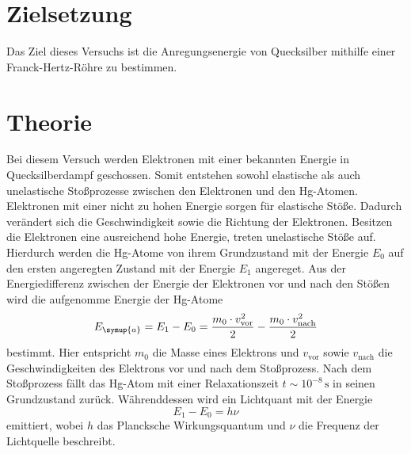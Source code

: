 \nocite{anleitungV601}
\section{Zielsetzung}
\label{sec:Zielsetzung}
Das Ziel dieses Versuchs ist die Anregungsenergie von Quecksilber mithilfe einer Franck-Hertz-Röhre zu bestimmen. 

\section{Theorie}
\label{sec:Theorie}
Bei diesem Versuch werden Elektronen mit einer bekannten Energie in Quecksilberdampf geschossen. Somit entstehen sowohl elastische als auch unelastische
Stoßprozesse zwischen den Elektronen und den Hg-Atomen. Elektronen mit einer nicht zu hohen Energie sorgen für elastische Stöße. Dadurch verändert sich die
Geschwindigkeit sowie die Richtung der Elektronen. Besitzen die Elektronen eine ausreichend hohe Energie, treten unelastische Stöße auf. Hierdurch werden die Hg-Atome
von ihrem Grundzustand mit der Energie $E_0$ auf den ersten angeregten Zustand mit der Energie $E_1$ angereget. Aus der Energiedifferenz zwischen der Energie der Elektronen 
vor und nach den Stößen wird die aufgenomme Energie der Hg-Atome
\begin{equation}
    E_{\symup{a}}=E_1 - E_0 =\frac{m_0\cdot v_{\text{vor}}^2}{2} - \frac{m_0\cdot v_{\text{nach}}^2}{2}
    \label{eqn:Energiedifferenz}
\end{equation}
bestimmt. Hier entspricht $m_0$ die Masse eines Elektrons und $v_{\text{vor}}$ sowie $v_{\text{nach}}$ die Geschwindigkeiten des Elektrons vor und nach dem Stoßprozess.
Nach dem Stoßprozess fällt das Hg-Atom mit einer Relaxationszeit $t \sim 10^{-8}\,\unit{\second}$ in seinen Grundzustand zurück. Währenddessen wird ein Lichtquant
mit der Energie 
\begin{equation}
  E_1 - E_0 = h \nu
  \label{eqn:EnergieLichtquants}
\end{equation}
emittiert, wobei $h$ das Plancksche Wirkungsquantum und $\nu$ die Frequenz der Lichtquelle beschreibt.
